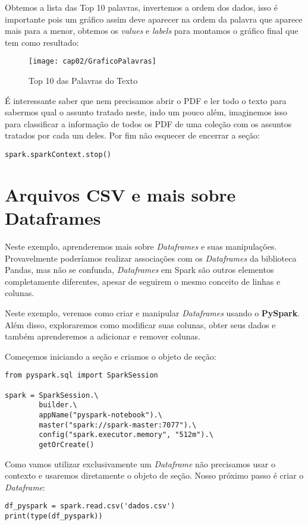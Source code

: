 Obtemos a lista das Top 10 palavras, invertemos a ordem dos dados, isso é importante pois um gráfico assim deve aparecer na ordem da palavra que aparece mais para a menor, obtemos os \textit{values} e \textit{labels} para montamos o gráfico final que tem como resultado:
\begin{figure}[H]
	\centering\texttt{[image: cap02/GraficoPalavras]}
	\caption{Top 10 das Palavras do Texto}
\end{figure}

É interessante saber que nem precisamos abrir o PDF e ler todo o texto para sabermos qual o assunto tratado neste, indo um pouco além, imaginemos isso para classificar a informação de todos os PDF de uma coleção com os assuntos tratados por cada um deles. Por fim não esquecer de encerrar a seção:
\begin{lstlisting}[]
spark.sparkContext.stop()
\end{lstlisting}

\section{Arquivos CSV e mais sobre Dataframes}
Neste exemplo, aprenderemos mais sobre \textit{Dataframes} e suas manipulações. Provavelmente poderíamos realizar associações com os \textit{Dataframes} da biblioteca Pandas, mas não se confunda, \textit{Dataframes} em Spark são outros elementos completamente diferentes, apesar de seguirem o mesmo conceito de linhas e colunas.

Neste exemplo, veremos como criar e manipular \textit{Dataframes} usando o \textbf{PySpark}. Além disso, exploraremos como modificar suas colunas, obter seus dados e também aprenderemos a adicionar e remover colunas. 

Começemos iniciando a seção e criamos o objeto de seção:
\begin{lstlisting}[]
from pyspark.sql import SparkSession

spark = SparkSession.\
        builder.\
        appName("pyspark-notebook").\
        master("spark://spark-master:7077").\
        config("spark.executor.memory", "512m").\
        getOrCreate()
\end{lstlisting}

Como vamos utilizar exclusivamente um \textit{Dataframe} não precisamos usar o contexto e usaremos diretamente o objeto de seção. Nosso próximo passo é criar o \textit{Dataframe}:
\begin{lstlisting}[]
df_pyspark = spark.read.csv('dados.csv')
print(type(df_pyspark))
\end{lstlisting}

